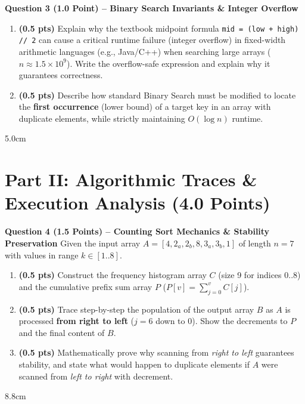 \documentclass[11pt,a4paper]{article}
\begin{document}
\textbf{Question 3 (1.0 Point) -- Binary Search Invariants \& Integer Overflow}
\begin{enumerate}[label=(\alph*)]
    \item \textbf{(0.5 pts)} Explain why the textbook midpoint formula \lstinline{mid = (low + high) // 2} can cause a critical runtime failure (integer overflow) in fixed-width arithmetic languages (e.g., Java/C++) when searching large arrays ($n \approx 1.5 \times 10^9$). Write the overflow-safe expression and explain why it guarantees correctness.
    \item \textbf{(0.5 pts)} Describe how standard Binary Search must be modified to locate the \textbf{first occurrence} (lower bound) of a target key in an array with duplicate elements, while strictly maintaining $O(\log n)$ runtime.
\end{enumerate}

\begin{answerbox}{5.0cm}
\end{answerbox}

\vspace{0.4em}

\section*{Part II: Algorithmic Traces \& Execution Analysis (4.0 Points)}

\textbf{Question 4 (1.5 Points) -- Counting Sort Mechanics \& Stability Preservation}
Given the input array $A = [4, 2_a, 2_b, 8, 3_a, 3_b, 1]$ of length $n = 7$ with values in range $k \in [1..8]$.
\begin{enumerate}[label=(\alph*)]
    \item \textbf{(0.5 pts)} Construct the frequency histogram array $C$ (size 9 for indices $0..8$) and the cumulative prefix sum array $P$ ($P[v] = \sum_{j=0}^v C[j]$).
    \item \textbf{(0.5 pts)} Trace step-by-step the population of the output array $B$ as $A$ is processed \textbf{from right to left} ($j = 6$ down to $0$). Show the decrements to $P$ and the final content of $B$.
    \item \textbf{(0.5 pts)} Mathematically prove why scanning from \textit{right to left} guarantees stability, and state what would happen to duplicate elements if $A$ were scanned from \textit{left to right} with decrement.
\end{enumerate}

\begin{answerbox}{8.8cm}
\end{answerbox}
\end{document}
